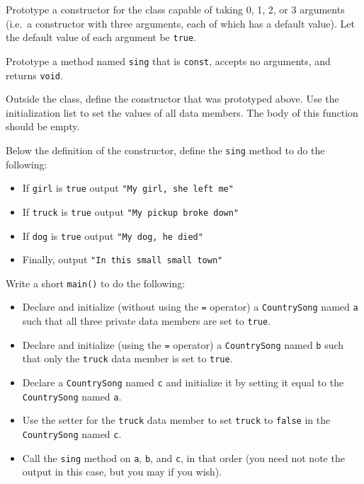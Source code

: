 Prototype a constructor for the class capable of taking 0, 1, 2, or 3 arguments
(i.e.~a constructor with three arguments, each of which has a default value).
Let the default value of each argument be \texttt{true}.

Prototype a method named \texttt{sing} that is
\texttt{const}, accepts no arguments, and returns
\texttt{void}.

Outside the class, define the constructor that was prototyped above.  Use the
initialization list to set the values of all data members.  The body of this
function should be empty.

Below the definition of the constructor, define the \texttt{sing}
method to do the following:
\begin{itemize}
  \item If \texttt{girl} is \texttt{true} output
    \texttt{"My girl, she left me\n"}
  \item If \texttt{truck} is \texttt{true} output
    \texttt{"My pickup broke down\n"}
  \item If \texttt{dog} is \texttt{true} output
    \texttt{"My dog, he died\n"}
  \item Finally, output \texttt{"In this small small town\n"}
\end{itemize}

Write a short \texttt{main()} to do the following:
\begin{itemize}
  \item Declare and initialize (without using the \texttt{=}
    operator) a \texttt{CountrySong} named \texttt{a} such
    that all three private data members are set to \texttt{true}.
  \item Declare and initialize (using the \texttt{=} operator) a
    \texttt{CountrySong} named \texttt{b} such that only the
    \texttt{truck} data member is set to \texttt{true}.
  \item Declare a \texttt{CountrySong} named \texttt{c} and
    initialize it by setting it equal to the \texttt{CountrySong}
    named \texttt{a}.
  \item Use the setter for the \texttt{truck} data member to set
    \texttt{truck} to \texttt{false} in the
    \texttt{CountrySong} named \texttt{c}.
  \item Call the \texttt{sing} method on \texttt{a},
    \texttt{b}, and \texttt{c}, in that order (you need not
    note the output in this case, but you may if you wish).
\end{itemize}

\newpage

\textQuestion{\makePageQuadrilleRuled}

\newOddPage

\textQuestion{\makePageQuadrilleRuled}



